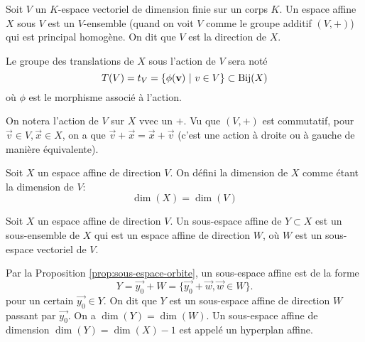 \begin{definition}
	Soit $V$ un $K$-espace vectoriel de dimension finie sur un corps $K$. Un
	espace affine $X$ sous $V$ est un $V$-ensemble (quand on voit $V$ comme le
	groupe additif $(V, +)$) qui est principal homogène. On dit que $V$ est la
	direction de $X$. 
\end{definition}

\begin{notation}
	Le groupe des translations de $X$ sous l'action de $V$ sera noté
	\begin{equation*}
		T(V) = t_V = \{\phi(\vec{v})\ |\ v \in V\} \subset \Bij(X)
	\end{equation*}
	où $\phi$ est le morphisme associé à l'action.
\end{notation}

\begin{notation}
	On notera l'action de $V$ sur $X$ vvec un $+$. Vu que $(V, +)$ est
	commutatif, pour $\vec{v} \in V, \vec{x} \in X$, on a que $\vec{v} + \vec{x}
	= \vec{x} + \vec{v}$ (c'est une action à droite ou à gauche de manière
	équivalente).
\end{notation}

\begin{definition}
	Soit $X$ un espace affine de direction $V$. On défini la dimension de $X$
	comme étant la dimension de $V$:
	\begin{equation*}
		\dim(X) = \dim(V)
	\end{equation*}
\end{definition}

\begin{definition}
	Soit $X$ un espace affine de direction $V$. Un sous-espace affine de $Y
	\subset X$ est un sous-ensemble de $X$ qui est un espace affine de direction
	$W$, où $W$ est un sous-espace vectoriel de $V$.
\end{definition}

\begin{remark}
	Par la Proposition \ref{prop:sous-espace-orbite}, un sous-espace affine est
	de la forme
	\begin{equation*}
		Y = \vec{y_0} + W = \{\vec{y_0} + \vec{w}, \vec{w} \in W\}.
	\end{equation*}
	pour un certain $\vec{y_0} \in Y$. On dit que $Y$ est un sous-espace affine
	de direction $W$ passant par $\vec{y_0}$. On a $\dim(Y) = \dim(W)$. Un
	sous-espace affine de dimension $\dim(Y) = \dim(X) - 1$ est appelé un
	hyperplan affine.
\end{remark}

